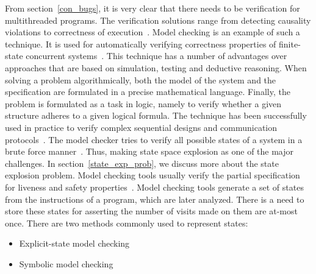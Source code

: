 From section~\ref{con_bugs}, it is very clear that there needs to be verification for multithreaded programs. 
The verification solutions range from detecting causality violations to correctness of execution~\citep{d2008survey}. 
Model checking is an example of such a technique. 
It is used for automatically verifying correctness properties of finite-state concurrent systems~\citep{model_check}\citep{berard2013systems}. 
This technique has a number of advantages over approaches that are based on simulation, testing and deductive reasoning. 
When solving a problem algorithmically, both the model of the system and the specification are formulated in a precise mathematical language. 
Finally, the problem is formulated as a task in logic, namely to verify whether a given structure adheres to a given logical formula.  
The technique has been successfully used in practice to verify complex sequential designs and communication protocols~\citep{model_check}. 
The model checker tries to verify all possible states of a system in a brute force manner~\citep{model_checking_principles}. 
Thus, making state space explosion as one of the major challenges.
In section~\ref{state_exp_prob}, we discuss more about the state explosion problem. 
Model checking tools usually verify the partial specification for liveness and safety properties~\citep{d2008survey}. 
Model checking tools generate a set of states from the instructions of a program, which are later analyzed. 
There is a need to store these states for asserting the number of visits made on them are at-most once. 
There are two methods commonly used to represent states:
\begin{itemize}
\item	Explicit-state model checking
\item	Symbolic model checking
\end{itemize}

